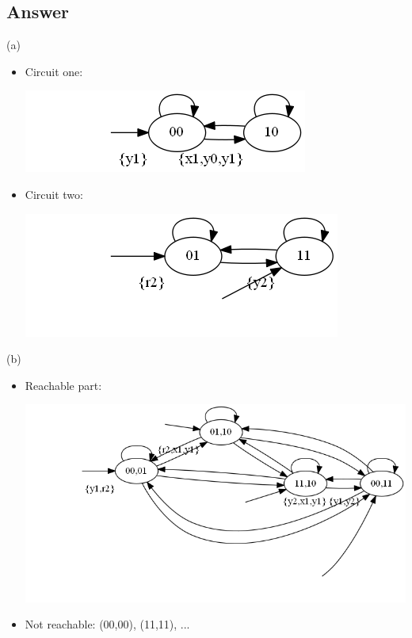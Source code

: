 \documentclass[12pt]{article}
\begin{document}
\subsection*{Answer}
(a) 
\begin{itemize}
	\item Circuit one:\\
	 \begin{centering}
		\includegraphics*[scale=0.5]{21a1.png}
	\end{centering}
	\item Circuit two:\\
	\begin{centering}
		\includegraphics*[scale=0.5]{21a2.png}
	\end{centering}
\end{itemize}
(b)
\begin{itemize}
	\item Reachable part:\\
	\begin{centering}
		\includegraphics*[scale=0.5]{21b.png}
	\end{centering}
	\item Not reachable: (00,00), (11,11), ...
\end{itemize}
\end{document}
